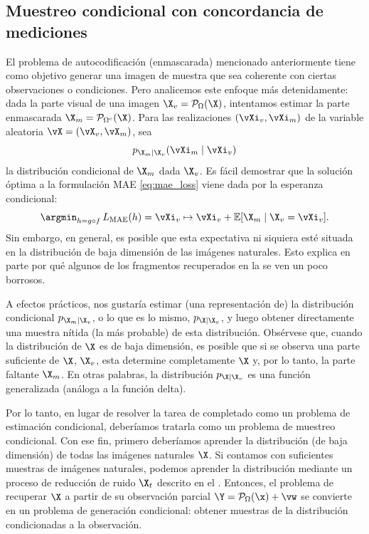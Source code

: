 \documentclass[../../book-main_es.tex]{subfiles}
\begin{document}
\subsection{Muestreo condicional con concordancia de mediciones}
\label{sec:conditioned-decoding}
El problema de autocodificación (enmascarada) mencionado anteriormente 
tiene como objetivo generar una imagen de muestra
que sea coherente con ciertas observaciones o condiciones. Pero
analicemos este enfoque más detenidamente: dada la
parte visual de una imagen $\X_v = \mathcal{P}_{\Omega}(\X)$, intentamos
estimar la parte enmascarada $\X_m = \mathcal{P}_{\Omega^c}(\X)$. Para las realizaciones
$(\vXi_v, \vXi_m)$ de la variable aleatoria $\vX=(\vX_v, \vX_m)$, sea
\[p_{\X_m \mid \X_v}(\vXi_m\mid \vXi_v)\]
la distribución condicional de $\X_m$ dada
$\X_v$. Es fácil demostrar que la solución óptima a la formulación MAE
\eqref{eq:mae_loss} viene dada por la esperanza condicional:
\begin{equation}
    \argmin_{h = g \circ f}\, L_{\mathrm{MAE}}(h)
    = \vXi_v \mapsto \vXi_v + \mathbb{E}[\X_m \mid \X_v=\vXi_v].
\end{equation}
Sin embargo, en general, es posible que esta expectativa ni siquiera esté situada en la
distribución de baja dimensión de las imágenes naturales. Esto explica en parte
por qué algunos de los fragmentos recuperados en la 
se ven un poco borrosos.

A efectos prácticos, nos gustaría estimar (una representación
de) la distribución condicional $p_{\X_m \mid \X_v}$, o lo que es lo mismo,
$p_{\X \mid \X_v}$,
y luego obtener directamente una muestra nítida (la más probable) de esta distribución. Obsérvese que, cuando la distribución de $\X$ es
de baja dimensión, es posible que si se observa una
parte suficiente de $\X$, $\X_v$, esta determine completamente
$\X$ y, por lo tanto, la parte faltante $\X_m$. En otras palabras, la distribución
$p_{\X \mid \X_v}$ es una función generalizada (análoga a la función delta).

Por lo tanto, en lugar de resolver la tarea de completado como un problema de estimación condicional,
deberíamos tratarla como un problema de muestreo condicional.
Con ese fin, primero deberíamos aprender la distribución (de baja dimensión)
de todas las imágenes naturales $\X$. Si contamos con suficientes
muestras de imágenes naturales, podemos aprender la distribución mediante un
proceso de reducción de ruido $\X_t$ descrito en el . Entonces, el
problema de recuperar $\X$ a partir de su observación parcial $\Y =
\mathcal{P}_\Omega(\x) +\vw$ se convierte en un problema de generación condicional: 
obtener muestras de la distribución condicionadas a la observación.
\end{document}
